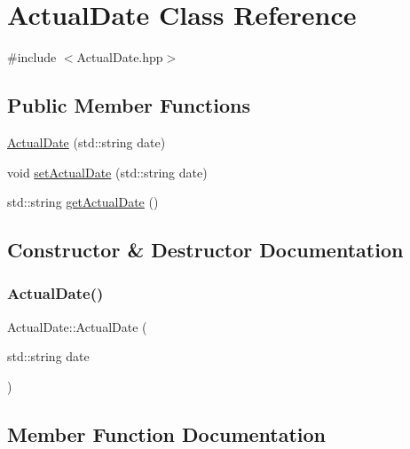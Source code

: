 \hypertarget{class_actual_date}{}\section{Actual\+Date Class Reference}
\label{class_actual_date}


{\ttfamily \#include $<$Actual\+Date.\+hpp$>$}

\subsection*{Public Member Functions}
\begin{DoxyCompactItemize}
\item 
\mbox{\hyperlink{class_actual_date_a5ef7ca879530a28df7242986555f8935}{Actual\+Date}} (std\+::string date)
\item 
void \mbox{\hyperlink{class_actual_date_a5c09dc7cd8e5c71e6550f1a4f821dc80}{set\+Actual\+Date}} (std\+::string date)
\item 
std\+::string \mbox{\hyperlink{class_actual_date_a11feb90256c0dfbdab50fcf0973a3153}{get\+Actual\+Date}} ()
\end{DoxyCompactItemize}


\subsection{Constructor \& Destructor Documentation}
\mbox{\label{class_actual_date_a5ef7ca879530a28df7242986555f8935}} 
\subsubsection{\texorpdfstring{ActualDate()}{ActualDate()}}
{\footnotesize\ttfamily Actual\+Date\+::\+Actual\+Date (\begin{DoxyParamCaption}\item[{std\+::string}]{date }\end{DoxyParamCaption})}



\subsection{Member Function Documentation}
\mbox{\label{class_actual_date_a11feb90256c0dfbdab50fcf0973a3153}} 

